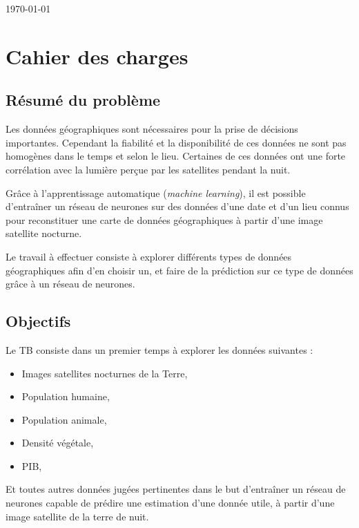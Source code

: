 \documentclass[a4paper, 11pt]{report}
\begin{document}
\begin{titlepage}
{\large \today}\\
 

\vfill %

\end{titlepage}

\tableofcontents

\chapter{Cahier des charges}

\section{Résumé du problème}
Les données géographiques sont nécessaires pour la prise de décisions importantes. Cependant la fiabilité et la disponibilité de ces données ne sont pas homogènes dans le temps et selon le lieu. Certaines de ces données ont une forte corrélation avec la lumière perçue par les satellites pendant la nuit.

Grâce à l'apprentissage automatique (\textit{machine learning}), il est possible d'entraîner un réseau de neurones sur des données d'une date et d'un lieu connus pour reconstituer une carte de données géographiques à partir d'une image satellite nocturne.

Le travail à effectuer consiste à explorer différents types de données géographiques afin d'en choisir un, et faire de la prédiction sur ce type de données grâce à un réseau de neurones.

\section{Objectifs}
Le TB consiste dans un premier temps à explorer les données suivantes :

\begin{itemize}
\item Images satellites nocturnes de la Terre,
\item Population humaine,
\item Population animale,
\item Densité végétale,
\item PIB,
\end{itemize}

Et toutes autres données jugées pertinentes dans le but d'entraîner un réseau de neurones capable de prédire une estimation d'une donnée utile, à partir d'une image satellite de la terre de nuit.
\end{document}
